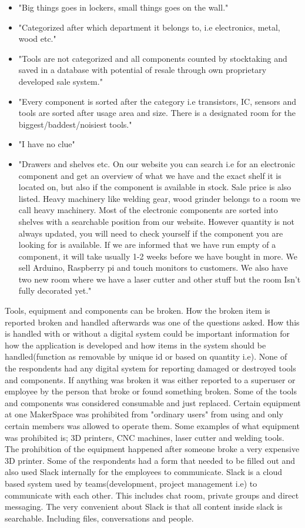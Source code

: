 \begin{itemize}
    \item "Big things goes in lockers, small things goes on the wall."
    \item "Categorized after which department it belongs to, i.e electronics, metal, wood etc."
    \item "Tools are not categorized and all components counted by stocktaking and saved in a database with potential of resale through own proprietary developed sale system."  
    \item "Every component is sorted after the category i.e transistors, IC, sensors and tools are sorted after usage area and size. There is a designated room for the biggest/baddest/noisiest tools." 
    \item "I have no clue"
    \item "Drawers and shelves etc. On our website you can search i.e for an electronic component and get an overview of what we have and the exact shelf it is located on, but also if the component is available in stock. Sale price is also listed. Heavy machinery like welding gear, wood grinder belongs to a room we call heavy machinery.
    Most of the electronic components are sorted into shelves with a searchable position from our website. However quantity is not always updated, you will need to check yourself if the component you are looking for is available. If we are informed that we have run empty of a component, it will take usually 1-2 weeks before we have bought in more. We sell Arduino, Raspberry pi and touch monitors to customers. We also have two new room where we have a laser cutter and other stuff but the room Isn't fully decorated yet."  
\end{itemize}

Tools, equipment and components can be broken. How the broken item is reported broken and handled afterwards was one of the questions asked. How this is handled with or without a digital system could be important information for how the application is developed and how items in the system should be handled(function as removable by unique id or based on quantity i.e). 
None of the respondents had any digital system for reporting damaged or destroyed tools and components. If anything was broken it was either reported to a superuser or employee by the person that broke or found something broken. Some of the tools and components was considered consumable and just replaced. Certain equipment at one MakerSpace was prohibited from "ordinary users" from using and only certain members was allowed to operate them. Some examples of what equipment was prohibited is; 3D printers, CNC machines, laser cutter and welding tools. The prohibition of the equipment happened after someone broke a very expensive 3D printer. 
Some of the respondents had a form that needed to be filled out and also used Slack internally for the employees to communicate. Slack is a cloud based system used by teams(development, project management i.e) to communicate with each other\cite{Slack_Software}. This includes chat room, private groups and direct messaging. The very convenient about Slack is that all content inside slack is searchable. Including files, conversations and people\cite{what_is_slack}.

